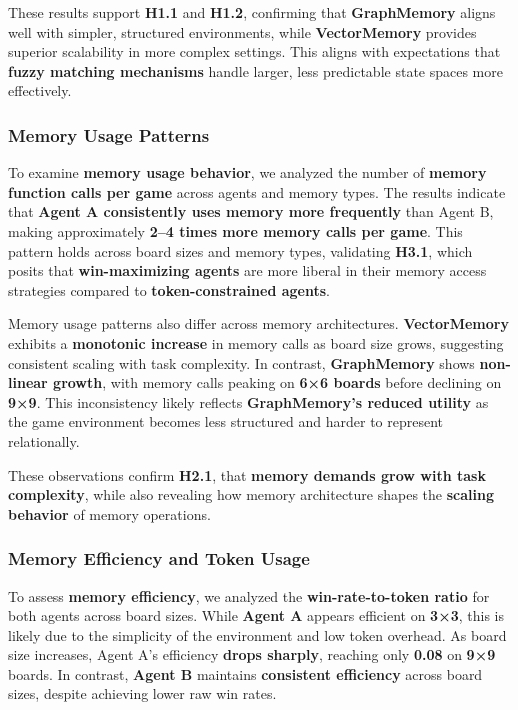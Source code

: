 \documentclass[12pt]{article}
\begin{document}
These results support \textbf{H1.1} and \textbf{H1.2}, confirming that \textbf{GraphMemory} aligns well with simpler, structured environments, while \textbf{VectorMemory} provides superior scalability in more complex settings. This aligns with expectations that \textbf{fuzzy matching mechanisms} handle larger, less predictable state spaces more effectively.

\subsubsection{Memory Usage Patterns}

To examine \textbf{memory usage behavior}, we analyzed the number of \textbf{memory function calls per game} across agents and memory types. The results indicate that \textbf{Agent A consistently uses memory more frequently} than Agent B, making approximately \textbf{2–4 times more memory calls per game}. This pattern holds across board sizes and memory types, validating \textbf{H3.1}, which posits that \textbf{win-maximizing agents} are more liberal in their memory access strategies compared to \textbf{token-constrained agents}.

Memory usage patterns also differ across memory architectures. \textbf{VectorMemory} exhibits a \textbf{monotonic increase} in memory calls as board size grows, suggesting consistent scaling with task complexity. In contrast, \textbf{GraphMemory} shows \textbf{non-linear growth}, with memory calls peaking on \textbf{6×6 boards} before declining on \textbf{9×9}. This inconsistency likely reflects \textbf{GraphMemory's reduced utility} as the game environment becomes less structured and harder to represent relationally.

These observations confirm \textbf{H2.1}, that \textbf{memory demands grow with task complexity}, while also revealing how memory architecture shapes the \textbf{scaling behavior} of memory operations.

\subsubsection{Memory Efficiency and Token Usage}

To assess \textbf{memory efficiency}, we analyzed the \textbf{win-rate-to-token ratio} for both agents across board sizes. While \textbf{Agent A} appears efficient on \textbf{3×3}, this is likely due to the simplicity of the environment and low token overhead. As board size increases, Agent A's efficiency \textbf{drops sharply}, reaching only \textbf{0.08} on \textbf{9×9} boards. In contrast, \textbf{Agent B} maintains \textbf{consistent efficiency} across board sizes, despite achieving lower raw win rates.
\end{document}
